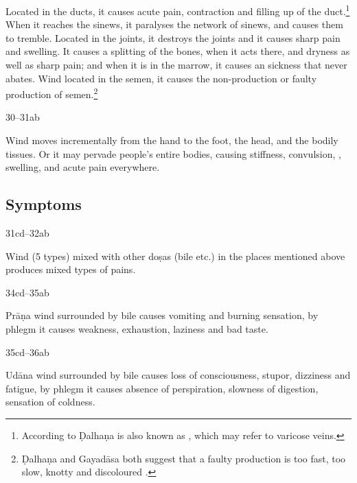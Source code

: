 \begin{translation}
Located in the ducts, it causes acute pain, contraction and filling up
of the duct.\footnote{According to Ḍalhaṇa  is also
    known as  \citep[262]{vulgate}, which may refer to
    varicose veins.} %
    When it reaches the sinews, it paralyses the network of sinews,
    and causes them to tremble.\label{ākṣepaka} %
    Located in the joints, it destroys the joints and it causes sharp
    pain and swelling. %
    It causes a splitting of the bones, when it acts there, and
    dryness as well as sharp pain; %
    and when it is in the marrow, it causes an sickness that never
    abates. %
    Wind located  in the semen, it  causes the non-production or faulty
    production of semen.\footnote{Ḍalhaṇa and Gayadāsa both suggest that
        a faulty production  is too fast, too
        slow, knotty and discoloured \cite[262]{vulgate}.}


\item[30--31ab]

Wind moves incrementally from the hand to the foot, the head, and the
bodily tissues.  Or it may pervade people's entire bodies, causing
stiffness, convulsion, , swelling, and acute pain
everywhere.


\subsection{Symptoms}

\item[31cd--32ab]

	Wind (5 types) mixed with other doṣas (bile etc.) in the places
	mentioned above produces mixed types of pains.

\item[34cd--35ab]

	Prāṇa wind surrounded by bile causes vomiting and burning sensation, by
	phlegm it causes weakness, exhaustion, laziness and bad taste. 

\item[35cd--36ab]

	Udāna wind surrounded by bile causes loss of consciousness, stupor,
	dizziness and fatigue, by phlegm it causes absence of perspiration,
	slowness of digestion, sensation of coldness.


\end{translation}
